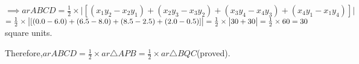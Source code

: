 \documentclass[12pt]{article}
\begin{document}
$\implies ar ABCD = \frac{1}{2}\times \big |[(x_1y_2-x_2y_1)+(x_2y_3-x_3y_2)+(x_3y_4-x_4y_3)+(x_4y_1-x_1y_4)] \big|$\\
$ = \frac{1}{2} \times \big |[(0.0-6.0)+(6.5-8.0)+(8.5-2.5)+(2.0-0.5)] \big|
 = \frac{1}{2} \times\big |30+30\big|\\
 =\frac{1}{2} \times60\\
 =30 $ square units.

 Therefore,$ar ABCD = \frac{1}{2}\times ar \triangle APB = \frac{1}{2}\times ar \triangle BQC$(proved).
\end{document}

